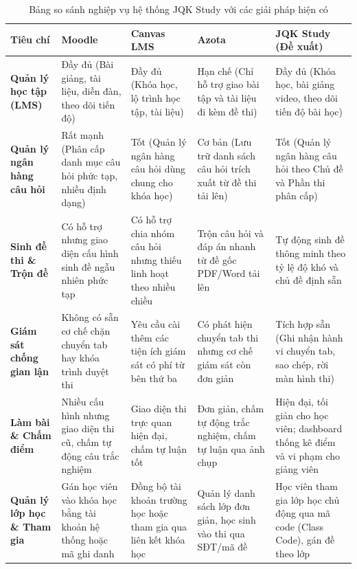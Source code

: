 \documentclass[../DoAn.tex]{subfiles}
\begin{document}
\begin{table}[H]
\centering
\fontsize{11pt}{14pt}\selectfont
\setlength{\tabcolsep}{4pt}
\begin{tabular}{|p{2.0cm}|>{\raggedright\arraybackslash}p{2.6cm}|>{\raggedright\arraybackslash}p{2.6cm}|>{\raggedright\arraybackslash}p{2.6cm}|>{\raggedright\arraybackslash}p{3.2cm}|}
\hline
\textbf{Tiêu chí} & \textbf{Moodle} & \textbf{Canvas LMS} & \textbf{Azota} & \textbf{JQK Study (Đề xuất)} \\ \hline

\textbf{Quản lý học tập (LMS)} & Đầy đủ (Bài giảng, tài liệu, diễn đàn, theo dõi tiến độ) & Đầy đủ (Khóa học, lộ trình học tập, tài liệu) & Hạn chế (Chỉ hỗ trợ giao bài tập và tài liệu đi kèm đề thi) & Đầy đủ (Khóa học, bài giảng video, theo dõi tiến độ bài học) \\ \hline

\textbf{Quản lý ngân hàng câu hỏi} & Rất mạnh (Phân cấp danh mục câu hỏi phức tạp, nhiều định dạng) & Tốt (Quản lý ngân hàng câu hỏi dùng chung cho khóa học) & Cơ bản (Lưu trữ danh sách câu hỏi trích xuất từ đề thi tải lên) & Tốt (Quản lý ngân hàng câu hỏi theo Chủ đề và Phần thi phân cấp) \\ \hline

\textbf{Sinh đề thi \& Trộn đề} & Có hỗ trợ nhưng giao diện cấu hình sinh đề ngẫu nhiên phức tạp & Có hỗ trợ chia nhóm câu hỏi nhưng thiếu linh hoạt theo nhiều chiều & Trộn câu hỏi và đáp án nhanh từ đề gốc PDF/Word tải lên & Tự động sinh đề thông minh theo tỷ lệ độ khó và chủ đề định sẵn \\ \hline

\textbf{Giám sát chống gian lận} & Không có sẵn cơ chế chặn chuyển tab hay khóa trình duyệt thi & Yêu cầu cài thêm các tiện ích giám sát có phí từ bên thứ ba & Có phát hiện chuyển tab thi nhưng cơ chế giám sát còn đơn giản & Tích hợp sẵn (Ghi nhận hành vi chuyển tab, sao chép, rời màn hình thi) \\ \hline

\textbf{Làm bài \& Chấm điểm} & Nhiều cấu hình nhưng giao diện thi cũ, chấm tự động câu trắc nghiệm & Giao diện thi trực quan hiện đại, chấm tự luận tốt & Đơn giản, chấm tự động trắc nghiệm, chấm tự luận qua ảnh chụp & Hiện đại, tối giản cho học viên; dashboard thống kê điểm và vi phạm cho giảng viên \\ \hline

\textbf{Quản lý lớp học \& Tham gia} & Gán học viên vào khóa học bằng tài khoản hệ thống hoặc mã ghi danh & Đồng bộ tài khoản trường học hoặc tham gia qua liên kết khóa học & Quản lý danh sách lớp đơn giản, học sinh vào thi qua SĐT/mã đề & Học viên tham gia lớp học chủ động qua mã code (Class Code), gán đề theo lớp \\ \hline
\end{tabular}
\caption{Bảng so sánh nghiệp vụ hệ thống JQK Study với các giải pháp hiện có}
\label{table:comparison_systems}
\end{table}
\end{document}
